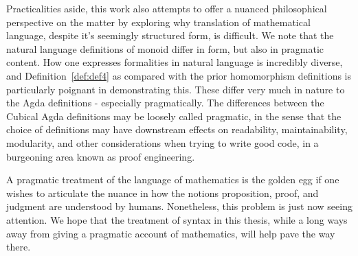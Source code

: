 Practicalities aside, this work also attempts to offer a nuanced philosophical
perspective on the matter by exploring why translation of mathematical language,
despite it's seemingly structured form, is difficult. We note that the natural
language definitions of monoid differ in form, but also in pragmatic content.
How one expresses formalities in natural language is incredibly diverse, and
Definition~\ref{def:def4} as compared with the prior homomorphism definitions is
particularly poignant in demonstrating this. These differ very much in nature to
the Agda definitions - especially pragmatically. The differences between the Cubical
Agda definitions may be loosely called pragmatic, in the sense that the choice
of definitions may have downstream effects on readability, maintainability, modularity, and other
considerations when trying to write good code, in a burgeoning area known as proof engineering.

A pragmatic treatment of the language of mathematics is the golden egg if one
wishes to articulate the nuance in how the notions proposition, proof, and
judgment are understood by humans. Nonetheless, this problem is just now seeing
attention. We hope that the treatment of syntax in this thesis, while a long
ways away from giving a pragmatic account of mathematics, will help pave the way
there.



